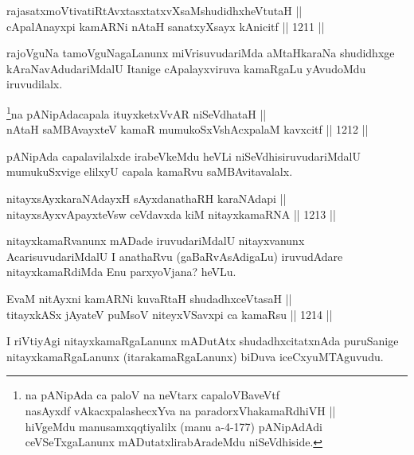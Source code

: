 \begin{shl}
rajasatxmoVtivatiRtAvxtasxtatxvXsaMshudidhxheVtutaH || \\
cApalAnayxpi kamARNi nAtaH sanatxyXsayx kAnicitf \hfill || 1211 ||  
\end{shl}

\begin{artha}
rajoVguNa tamoVguNagaLanunx miVrisuvudariMda aMtaHkaraNa shudidhxge kAraNavAdudariMdalU Itanige cApalayxviruva kamaRgaLu yAvudoMdu iruvudilalx.
\end{artha}


\begin{shl}
\footnote{na pANipAda ca paloV na neVtarx capaloVBaveVtf\\
nasAyxdf vAkacxpalashecxYva na paradorxVhakamaRdhiVH ||\\ hiVgeMdu manusamxqqtiyalilx (manu a-4-177) pANipAdAdi ceVSeTxgaLanunx mADutatxlirabAradeMdu niSeVdhiside.}na pANipAdacapala ituyxketxVvAR niSeVdhataH || \\
nAtaH saMBAvayxteV kamaR mumukoSxVshAcxpalaM kavxcitf \hfill || 1212 ||  
\end{shl}

\begin{artha}
pANipAda capalavilalxde irabeVkeMdu heVLi niSeVdhisiruvudariMdalU mumukuSxvige elilxyU capala kamaRvu saMBAvitavalalx.
\end{artha}

\begin{shl}
nitayxsAyxkaraNAdayxH sAyxdanathaRH karaNAdapi || \\
nitayxsAyxvApayxteV\s sw ceVdavxda kiM nitayxkamaRNA \hfill || 1213 ||  
\end{shl}

\begin{artha}
nitayxkamaRvanunx mADade iruvudariMdalU nitayxvanunx AcarisuvudariMdalU I anathaRvu (gaBaRvAsAdigaLu) iruvudAdare nitayxkamaRdiMda Enu parxyoVjana? heVLu.
\end{artha}

\begin{shl}
EvaM nitAyxni kamARNi kuvaRtaH shudadhxceVtasaH || \\
titayxkASx jAyateV puMsoV niteyxVSavxpi ca kamaRsu \hfill || 1214 ||  
\end{shl}

\begin{artha}
I riVtiyAgi nitayxkamaRgaLanunx mADutAtx shudadhxcitatxnAda puruSanige nitayxkamaRgaLanunx (itarakamaRgaLanunx) biDuva iceCxyuMTAguvudu.
\end{artha}

